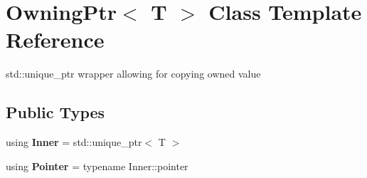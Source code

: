 \hypertarget{structOwningPtr}{}\section{Owning\+Ptr$<$ T $>$ Class Template Reference}
\label{structOwningPtr}


std\+::unique\+\_\+ptr wrapper allowing for copying owned value  


\subsection*{Public Types}
\begin{DoxyCompactItemize}
\item 
\mbox{\label{structOwningPtr_a9364e9b341ef0ad4f6b92763bdc7e733}} 
using {\bfseries Inner} = std\+::unique\+\_\+ptr$<$ T $>$
\item 
\mbox{\label{structOwningPtr_a9d2a5e85b4c0da8949b4bbe541ddb333}} 
using {\bfseries Pointer} = typename Inner\+::pointer
\end{DoxyCompactItemize}
